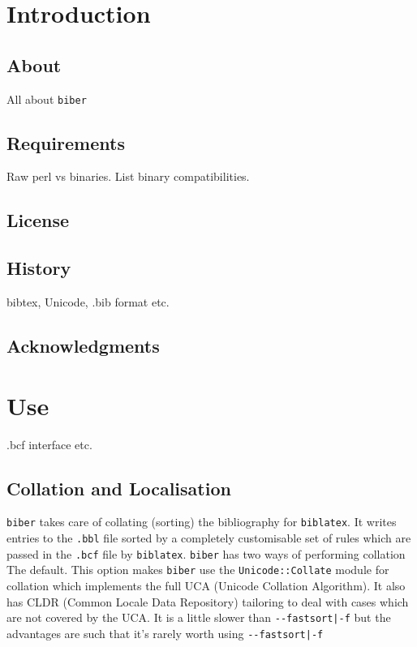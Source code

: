 \documentclass{ltxdockit}
\def\biberex#1{\hbox{\hspace{-4em}\texttt{\small \detokenize{#1}}}}
\begin{document}
\printtitlepage
\tableofcontents

\section{Introduction}
\label{int}

\subsection{About}

All about \verb+biber+

\subsection{Requirements}\label{ref:req}

Raw perl vs binaries. List binary compatibilities.

\subsection{License}


\subsection{History}

bibtex, Unicode, .bib format etc.

\subsection{Acknowledgments}


\section{Use}\label{ref:use}
\label{use}

.bcf interface etc.

\subsection{Collation and Localisation}

\verb+biber+ takes care of collating (sorting) the bibliography for
\verb+biblatex+. It writes entries to the \verb+.bbl+ file sorted by a
completely customisable set of rules which are passed in the
\verb+.bcf+ file by \verb+biblatex+. \verb+biber+ has two ways of performing
collation\\[2ex]

\biberex{--collate|-C} The default. This option makes \verb+biber+ use the
  \verb+Unicode::Collate+ module for collation which implements the full UCA (Unicode
  Collation Algorithm). It also has CLDR (Common Locale Data
  Repository) tailoring to deal with cases which are not covered by the
  UCA. It is a little slower than \verb+--fastsort|-f+ but the
  advantages are such that it's rarely worth using \verb+--fastsort|-f+\\[1ex]
\end{document}
